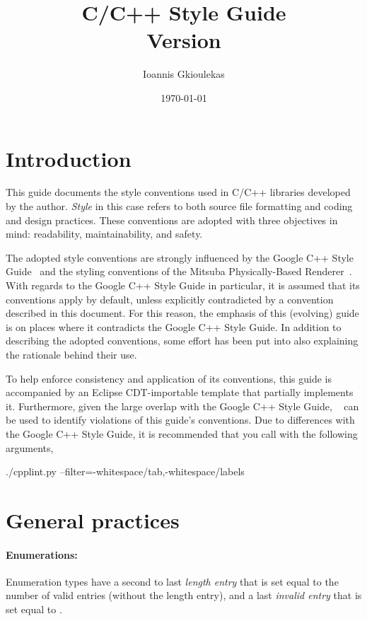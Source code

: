 \documentclass[footinclude=false,11pt,DIV11]{scrartcl}
\title{
	C/C++ Style Guide\\
	\LARGE Version \GuideVersion
}
\author{Ioannis Gkioulekas}
\date{\today}
\begin{document}
\maketitle

\tableofcontents


\section{Introduction}

This guide documents the style conventions used in C/C++ libraries developed
by the author. \emph{Style} in this case refers to both source file formatting and
coding and design practices. These conventions are adopted with three objectives in
mind: readability, maintainability, and safety.

The adopted style conventions are strongly influenced by the Google C++ Style
Guide~\cite{Google} and the styling conventions of the Mitsuba Physically-Based
Renderer~\cite{Mitsuba}. With regards to the Google C++ Style Guide in particular, it
is assumed that its conventions apply by default, unless explicitly contradicted by a
convention described in this document. For this reason, the emphasis of this (evolving)
guide is on places where it contradicts the Google C++ Style Guide. In addition to
describing the adopted conventions, some effort has been put into also explaining the
rationale behind their use.

To help enforce consistency and application of its conventions, this guide is
accompanied by an Eclipse CDT-importable template that partially implements it.
Furthermore, given the large overlap with the Google C++ Style Guide,
~\cite{cpplint} can be used to identify violations of this guide's
conventions. Due to differences with the Google C++ Style Guide, it is recommended that
you call  with the following arguments,
\begin{shell}
./cpplint.py --filter=-whitespace/tab,-whitespace/labels
\end{shell}


\section{General practices}

\paragraph{Enumerations:} Enumeration types have a second to last \emph{length
entry} that is set equal to the number of valid entries (without the length 
entry), and a last \emph{invalid entry} that is set equal to .
\end{document}
